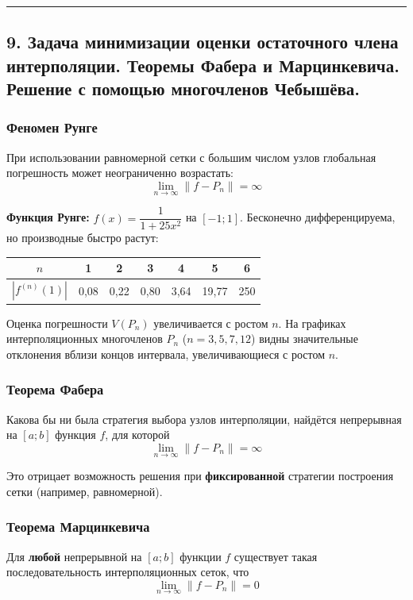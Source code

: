 \documentclass[14pt,a4paper]{extarticle}
\begin{document}
\hrule\bigskip

\subsection{9. Задача минимизации оценки остаточного члена интерполяции. Теоремы Фабера и Марцинкевича. Решение с помощью многочленов Чебышёва.}

\subsubsection{Феномен Рунге}

При использовании равномерной сетки с большим числом узлов глобальная погрешность может неограниченно возрастать:
\[\lim_{n \to \infty} \|f - P_n\| = \infty\]

\textbf{Функция Рунге:} $f(x) = \dfrac{1}{1 + 25x^2}$ на $[-1; 1]$. Бесконечно дифференцируема, но производные быстро растут:

\begin{center}
\begin{tabular}{c|c|c|c|c|c|c}
\toprule
$n$ & 1 & 2 & 3 & 4 & 5 & 6 \\
\midrule
$|f^{(n)}(1)|$ & 0,08 & 0,22 & 0,80 & 3,64 & 19,77 & 250 \\
\bottomrule
\end{tabular}
\end{center}

Оценка погрешности $V(P_n)$ увеличивается с ростом $n$. На графиках интерполяционных многочленов $P_n$ ($n = 3, 5, 7, 12$) видны значительные отклонения вблизи концов интервала, увеличивающиеся с ростом $n$.

\subsubsection{Теорема Фабера}

Какова бы ни была стратегия выбора узлов интерполяции, найдётся непрерывная на $[a; b]$ функция $f$, для которой
\[\lim_{n \to \infty} \|f - P_n\| = \infty\]

Это отрицает возможность решения при \textbf{фиксированной} стратегии построения сетки (например, равномерной).

\subsubsection{Теорема Марцинкевича}

Для \textbf{любой} непрерывной на $[a; b]$ функции $f$ существует такая последовательность интерполяционных сеток, что
\[\lim_{n \to \infty} \|f - P_n\| = 0\]
\end{document}
